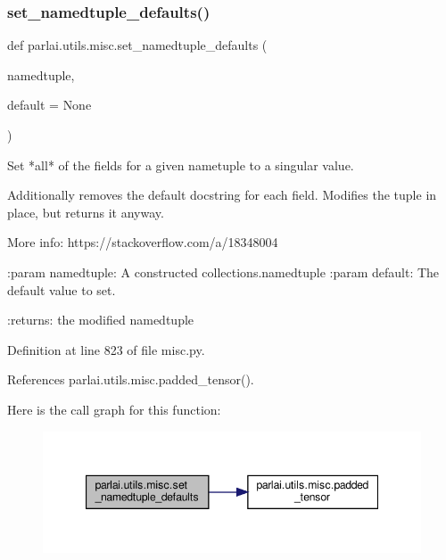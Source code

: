 \subsubsection{\texorpdfstring{set\+\_\+namedtuple\+\_\+defaults()}{set\_namedtuple\_defaults()}}
{\footnotesize\ttfamily def parlai.\+utils.\+misc.\+set\+\_\+namedtuple\+\_\+defaults (\begin{DoxyParamCaption}\item[{}]{namedtuple,  }\item[{}]{default = {\ttfamily None} }\end{DoxyParamCaption})}

\begin{DoxyVerb}Set *all* of the fields for a given nametuple to a singular value.

Additionally removes the default docstring for each field.
Modifies the tuple in place, but returns it anyway.

More info:
https://stackoverflow.com/a/18348004

:param namedtuple: A constructed collections.namedtuple
:param default: The default value to set.

:returns: the modified namedtuple
\end{DoxyVerb}
 

Definition at line 823 of file misc.\+py.



References parlai.\+utils.\+misc.\+padded\+\_\+tensor().

Here is the call graph for this function\+:
\nopagebreak
\begin{figure}[H]
\begin{center}
\leavevmode
\includegraphics[width=347pt]{namespaceparlai_1_1utils_1_1misc_a8781cc03272b3a118fcd9e5a9f4ca1dd_cgraph}
\end{center}
\end{figure}
\mbox{\label{namespaceparlai_1_1utils_1_1misc_a1b053cd9c56e6fa79b058fff587b3a48}} 
